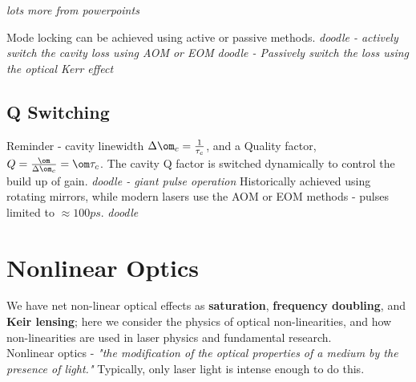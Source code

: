 \documentclass[a4paper, 11pt, normalem]{report}
\begin{document}
\textit{lots more from powerpoints}

Mode locking can be achieved using active or passive methods. 
\textit{doodle - actively switch the cavity loss using AOM or EOM}
\textit{doodle - Passively switch the loss using the optical Kerr effect}

\section{Q Switching}
Reminder - cavity linewidth $\Delta\om_c = \frac{1}{\tau_c}$, and a Quality factor, $Q = \frac{\om}{\Delta\om_c} = \om\tau_c$.
The cavity Q factor is switched dynamically to control the build up of gain. 
\textit{doodle - giant pulse operation}
Historically achieved using rotating mirrors, while modern lasers use the AOM or EOM methods - pulses limited to $\approx 100ps$. 
\textit{doodle}

\chapter{Nonlinear Optics}
We have net non-linear optical effects as \textbf{saturation}, \textbf{frequency doubling}, and \textbf{Keir lensing}; here we consider the physics of optical non-linearities, and how non-linearities are used in laser physics and fundamental research. \\
Nonlinear optics - \emph{"the modification of the optical properties of a medium by the presence of light."}
Typically, only laser light is intense enough to do this. 
\end{document}
